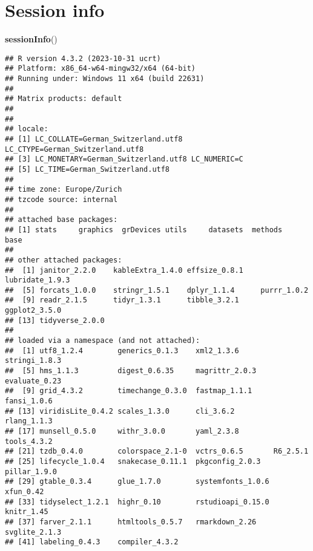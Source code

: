 \documentclass[
]{article}
\newenvironment{Shaded}{\begin{snugshade}}{\end{snugshade}}
\newcommand{\FunctionTok}[1]{\textcolor[rgb]{0.13,0.29,0.53}{\textbf{#1}}}
\newcommand{\NormalTok}[1]{#1}
\begin{document}
\hypertarget{session-info}{%
\section{Session info}\label{session-info}}

\begin{Shaded}
\begin{Highlighting}[]
\FunctionTok{sessionInfo}\NormalTok{()}
\end{Highlighting}
\end{Shaded}

\begin{verbatim}
## R version 4.3.2 (2023-10-31 ucrt)
## Platform: x86_64-w64-mingw32/x64 (64-bit)
## Running under: Windows 11 x64 (build 22631)
## 
## Matrix products: default
## 
## 
## locale:
## [1] LC_COLLATE=German_Switzerland.utf8  LC_CTYPE=German_Switzerland.utf8   
## [3] LC_MONETARY=German_Switzerland.utf8 LC_NUMERIC=C                       
## [5] LC_TIME=German_Switzerland.utf8    
## 
## time zone: Europe/Zurich
## tzcode source: internal
## 
## attached base packages:
## [1] stats     graphics  grDevices utils     datasets  methods   base     
## 
## other attached packages:
##  [1] janitor_2.2.0    kableExtra_1.4.0 effsize_0.8.1    lubridate_1.9.3 
##  [5] forcats_1.0.0    stringr_1.5.1    dplyr_1.1.4      purrr_1.0.2     
##  [9] readr_2.1.5      tidyr_1.3.1      tibble_3.2.1     ggplot2_3.5.0   
## [13] tidyverse_2.0.0 
## 
## loaded via a namespace (and not attached):
##  [1] utf8_1.2.4        generics_0.1.3    xml2_1.3.6        stringi_1.8.3    
##  [5] hms_1.1.3         digest_0.6.35     magrittr_2.0.3    evaluate_0.23    
##  [9] grid_4.3.2        timechange_0.3.0  fastmap_1.1.1     fansi_1.0.6      
## [13] viridisLite_0.4.2 scales_1.3.0      cli_3.6.2         rlang_1.1.3      
## [17] munsell_0.5.0     withr_3.0.0       yaml_2.3.8        tools_4.3.2      
## [21] tzdb_0.4.0        colorspace_2.1-0  vctrs_0.6.5       R6_2.5.1         
## [25] lifecycle_1.0.4   snakecase_0.11.1  pkgconfig_2.0.3   pillar_1.9.0     
## [29] gtable_0.3.4      glue_1.7.0        systemfonts_1.0.6 xfun_0.42        
## [33] tidyselect_1.2.1  highr_0.10        rstudioapi_0.15.0 knitr_1.45       
## [37] farver_2.1.1      htmltools_0.5.7   rmarkdown_2.26    svglite_2.1.3    
## [41] labeling_0.4.3    compiler_4.3.2
\end{verbatim}
\end{document}
